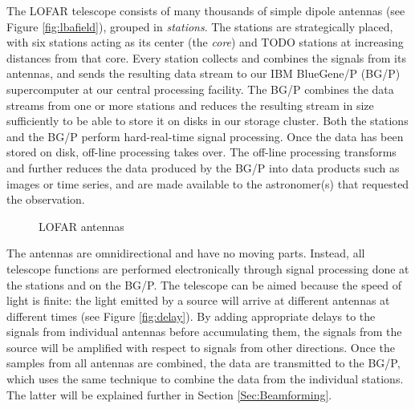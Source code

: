 \documentclass{llncs}
\begin{document}
The LOFAR telescope consists of many thousands of simple dipole antennas (see Figure \ref{fig:lbafield}), grouped in \emph{stations}. The stations are strategically placed, with six stations acting as its center (the \emph{core}) and TODO stations at increasing distances from that core. Every station collects and combines the signals from its antennas, and sends the resulting data stream to our IBM BlueGene/P (BG/P) supercomputer at our central processing facility. The BG/P combines the data streams from one or more stations and reduces the resulting stream in size sufficiently to be able to store it on disks in our storage cluster. Both the stations and the BG/P perform hard-real-time signal processing. Once the data has been stored on disk, off-line processing takes over. The off-line processing transforms and further reduces the data produced by the BG/P into data products such as images or time series, and are made available to the astronomer(s) that requested the observation.

\begin{figure}[ht]
\hfill
{}
\caption{LOFAR antennas}
\end{figure}

The antennas are omnidirectional and have no moving parts. Instead, all telescope functions are performed electronically through signal processing done at the stations and on the BG/P. The telescope can be aimed because the speed of light is finite: the light emitted by a source will arrive at different antennas at different times (see Figure \ref{fig:delay}). By adding appropriate delays to the signals from individual antennas before accumulating them, the signals from the source will be amplified with respect to signals from other directions. Once the samples from all antennas are combined, the data are transmitted to the BG/P, which uses the same technique to combine the data from the individual stations. The latter will be explained further in Section \ref{Sec:Beamforming}.
\end{document}
